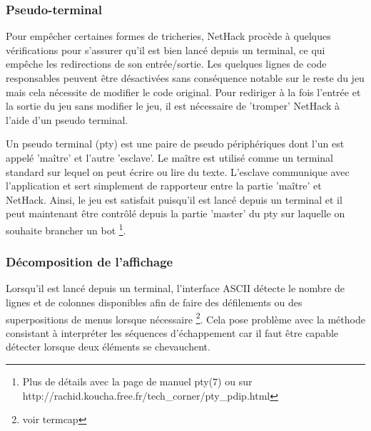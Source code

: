 \documentclass[a4paper,11pt]{article}
\begin{document}
\subsubsection*{Pseudo-terminal}

Pour empêcher certaines formes de tricheries, NetHack procède à quelques vérifications pour s'assurer qu'il est bien lancé depuis un terminal, ce qui empêche les redirections de son entrée/sortie. Les quelques lignes de code responsables peuvent être désactivées sans conséquence notable sur le reste du jeu mais cela nécessite de modifier le code original. Pour rediriger à la fois l'entrée et la sortie du jeu sans modifier le jeu, il est nécessaire de 'tromper' NetHack à l'aide d'un pseudo terminal.

Un pseudo terminal (pty) est une paire de pseudo périphériques dont l'un est appelé 'maître' et l'autre 'esclave'. Le maître est utilisé comme un terminal standard sur lequel on peut écrire ou lire du texte. L'esclave communique avec l'application et sert simplement de rapporteur entre la partie 'maître' et NetHack. Ainsi, le jeu est satisfait puisqu'il est lancé depuis un terminal et il peut maintenant être contrôlé depuis la partie 'master' du pty sur laquelle on souhaite brancher un bot \footnote{Plus de détails avec la page de manuel pty(7) ou sur http://rachid.koucha.free.fr/tech\_corner/pty\_pdip.html}.


\subsubsection*{Décomposition de l'affichage}

Lorsqu'il est lancé depuis un terminal, l'interface ASCII détecte le nombre de lignes et de colonnes disponibles afin de faire des défilements ou des superpositions de menus lorsque nécessaire \footnote{voir termcap}. Cela pose problème avec la méthode consistant à interpréter les séquences d'échappement car il faut être capable détecter lorsque deux éléments se chevauchent.
\end{document}
